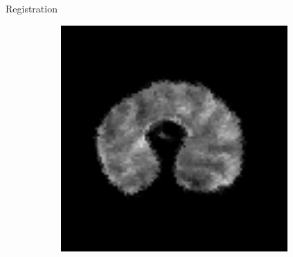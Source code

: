 \documentclass[10pt]{beamer}
\begin{document}
\begin{frame}{Registration}
\begin{figure}[ht]
\begin{subfigure}[t]{0.25\textwidth}
    \caption{}
    \label{subfig:registration_wheat_affine}
  \end{subfigure}%
  \begin{subfigure}[t]{0.25\textwidth}
    \centering
    \includegraphics[width=0.95\textwidth]{fig/registration_wheat_dtssd}
    \caption{}
    \label{subfig:registration_wheat_dtssd}
  \end{subfigure}%
\end{figure}
\end{frame}

\end{document}
